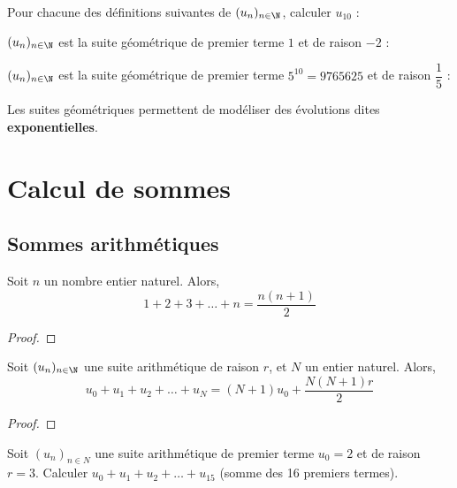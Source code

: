 \documentclass{article}
\begin{document}
\begin{example}
Pour chacune des définitions suivantes de $(u_n)_{n \in \N}$, calculer $u_{10}$ :
\begin{enumquestions}
\item $(u_n)_{n \in \N}$ est la suite géométrique de premier terme $1$ et de raison $-2$ : \answersline
\item $(u_n)_{n \in \N}$ est la suite géométrique de premier terme $5^{10} = \num{9765625}$ et de raison $\dfrac{1}{5}$ : \answersline
\end{enumquestions}
\end{example}
\begin{tcolorbox}
\begin{definition}
Les suites géométriques permettent de modéliser des évolutions dites \textbf{exponentielles}.         
\end{definition}
\end{tcolorbox}
\newpage
\section{Calcul de sommes}
\subsection{Sommes arithmétiques}
\begin{tcolorbox}
\begin{proposition}
Soit $n$ un nombre entier naturel. Alors,
\begin{equation*}
1 + 2 + 3 + \dots + n = \dfrac{n(n+1)}{2}
\end{equation*}
\end{proposition}
\end{tcolorbox}
\begin{proof}
\hfill

\vspace{0.2cm}
\emptybox{5cm}
\end{proof}
\begin{proposition}
Soit $(u_n)_{n \in \N}$ une suite arithmétique de raison $r$, et $N$ un entier naturel. Alors,
\begin{equation*}
u_0 + u_1 + u_2 + \dots + u_N = (N+1)u_0 + \dfrac{N(N+1)r}{2}
\end{equation*}
\end{proposition}
\begin{proof}
\hfill

\vspace{0.2cm}
\emptybox{5cm}
\end{proof}
\begin{example}
Soit $(u_n)_{n \in N}$ une suite arithmétique de premier terme $u_0 = 2$ et de raison $r = 3$. Calculer $u_0 + u_1 + u_2 + \dots + u_{15}$ (somme des 16 premiers termes).

\vspace*{0.2cm}
\emptybox{3cm}
\end{example}
\end{document}

